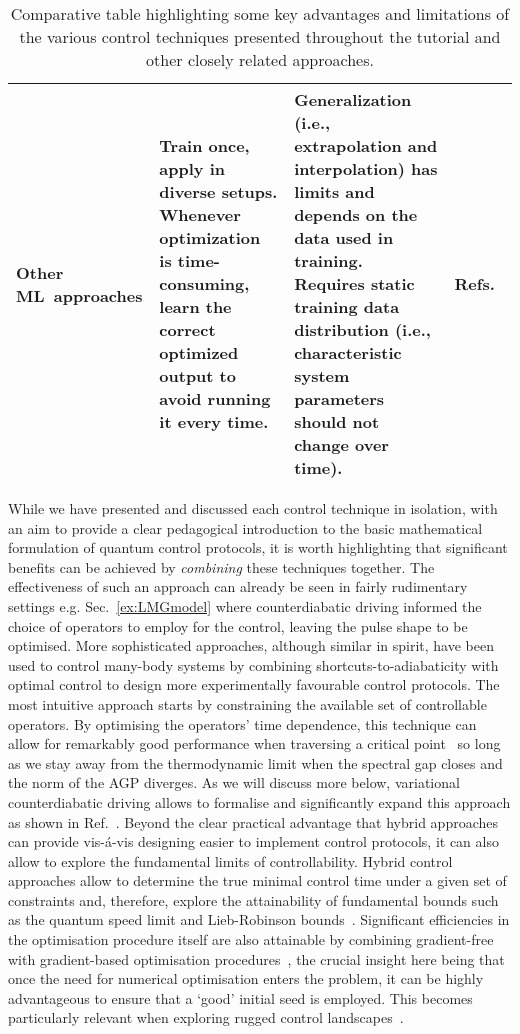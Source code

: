 \begin{table}[h!]
\begin{tabular}{|p{2.5cm}|p{5.5cm}|p{5.5cm}|p{1.5cm}|}
\hline
Other ML~approaches & Train once, apply in diverse setups. Whenever optimization is time-consuming, learn the correct optimized output to avoid running it every time. & Generalization (i.e., extrapolation and interpolation) has limits and depends on the data used in training. Requires static training data distribution (i.e., characteristic system parameters should not change over time). & Refs.~\cite{mehta2019high,carleo2019machine} \\
\hline
\end{tabular}
\caption{Comparative table highlighting some key advantages and limitations of the various control techniques presented throughout the tutorial and other closely related approaches.}
\label{table:comparisons}
\end{table}

While we have presented and discussed each control technique in isolation, with an aim to provide a clear pedagogical introduction to the basic mathematical formulation of quantum control protocols, it is worth highlighting that significant benefits can be achieved by {\it combining} these techniques together. The effectiveness of such an approach can already be seen in fairly rudimentary settings e.g. Sec.~\ref{ex:LMGmodel} where counterdiabatic driving informed the choice of operators to employ for the control, leaving the pulse shape to be optimised. More sophisticated approaches, although similar in spirit, have been used to control many-body systems by combining shortcuts-to-adiabaticity with optimal control to design more experimentally favourable control protocols. The most intuitive approach starts by constraining the available set of controllable operators. By optimising the operators' time dependence, this technique can allow for remarkably good performance when traversing a critical point~\cite{Saberi2014, CampbellPRL} so long as we stay away from the thermodynamic limit when the spectral gap closes and the norm of the AGP diverges. As we will discuss more below, variational counterdiabatic driving allows  to formalise and significantly expand this approach as shown in Ref.~\cite{COLD_PRXQ}. Beyond the clear practical advantage that hybrid approaches can provide vis-\'a-vis designing easier to implement control protocols, it can also allow to explore the fundamental limits of controllability. Hybrid control approaches allow to determine the true minimal control time under a given set of constraints and, therefore, explore the attainability of fundamental bounds such as the quantum speed limit and Lieb-Robinson bounds~\cite{Kiely2021NJP, Kiely2022PRR}. Significant efficiencies in the optimisation procedure itself are also attainable by combining gradient-free with gradient-based optimisation procedures~\cite{KochEPJQT2015}, the crucial insight here being that once the need for numerical optimisation enters the problem, it can be highly advantageous to ensure that a `good' initial seed is employed. This becomes particularly relevant when exploring rugged control landscapes~\cite{Chakrabarti2007, Beato2024a, Beato2024b, Fentaw2025}.

